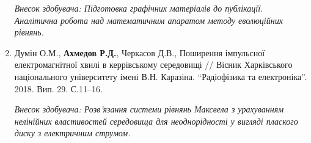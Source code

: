 \begin{enumerate}
\textit{Внесок здобувача: Підготовка графічних матеріалів до публікації. 
Аналітична робота над математичним апаратом методу еволюційних рівнянь.}

\item Думін О.М., \textbf{Ахмедов Р.Д.}, Черкасов Д.В., Поширення імпульсної 
електромагнітної хвилі в керрівському середовищі // Вісник Харківського 
національного університету імені В.Н. Каразіна. ``Радіофізика та 
електроніка''. 2018. Вип. 29. С.11--16.

\textit{Внесок здобувача: Розв'язання системи рівнянь Максвела з урахуванням
нелінійних властивостей середовища для неоднорідності у вигляді плаского 
диску з електричним струмом.}

\setcounter{ItemsInMyWriting}{\value{enumi}}
\end{enumerate}

